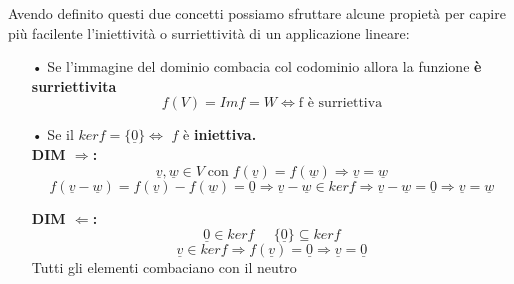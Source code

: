 Avendo definito questi due concetti possiamo sfruttare alcune propietà per capire più facilente l'iniettività o surriettività di un applicazione lineare:
\begin{itemize}
\item[•] Se l'immagine del dominio combacia col codominio allora la funzione \textbf{è surriettivita}
$$ f(V) = Im f = W \Leftrightarrow \text{f è surriettiva} $$

\item[•] Se il $ker f = \{\underline{0}\} \Leftrightarrow$ $f$ è \textbf{iniettiva.}\\

\subitem \textbf{DIM $\Rightarrow$:}
$$ \underline{v},\underline{w} \in V \; \text{con} \; f(\underline{v}) = f(\underline{w}) \Rightarrow \underline{v} = \underline{w} $$
$$ f(\underline{v}-\underline{w}) = f(\underline{v})-f(\underline{w}) = \underline{0} \Rightarrow \underline{v}-\underline{w} \in ker f \Rightarrow \underline{v}-\underline{w} = \underline{0} \Rightarrow \underline{v} = \underline{w}$$

\subitem \textbf{DIM $\Leftarrow$:}
$$ \underline{0} \in ker f \;\;\;\;\; \{\underline{0}\} \subseteq ker f $$
$$ \underline{v} \in ker f \Rightarrow f(\underline{v}) = \underline{0} \Rightarrow \underline{v} = \underline{0} $$
Tutti gli elementi combaciano con il neutro

\end{itemize}


